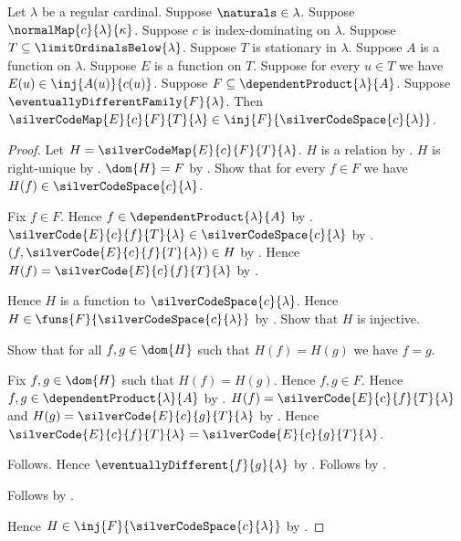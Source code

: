 \begin{theorem}\label{silver_code_map_is_injection}
    Let $\lambda$ be a regular cardinal.
    Suppose $\naturals\in\lambda$.
    Suppose $\normalMap{c}{\lambda}{\kappa}$.
    Suppose $c$ is index-dominating on $\lambda$.
    Suppose $T\subseteq\limitOrdinalsBelow{\lambda}$.
    Suppose $T$ is stationary in $\lambda$.
    Suppose $A$ is a function on $\lambda$.
    Suppose $E$ is a function on $T$.
    Suppose for every $u\in T$ we have
        $E(u)\in\inj{A(u)}{c(u)}$.
    Suppose $F\subseteq\dependentProduct{\lambda}{A}$.
    Suppose $\eventuallyDifferentFamily{F}{\lambda}$.
    Then $\silverCodeMap{E}{c}{F}{T}{\lambda}
        \in\inj{F}{\silverCodeSpace{c}{\lambda}}$.
\end{theorem}
\begin{proof}
    Let $H=\silverCodeMap{E}{c}{F}{T}{\lambda}$.
    $H$ is a relation by .
    $H$ is right-unique
        by .
    $\dom{H}=F$
        by .
    Show that for every $f\in F$ we have
        $H(f)\in\silverCodeSpace{c}{\lambda}$.
    \begin{subproof}
        Fix $f\in F$.
        Hence $f\in\dependentProduct{\lambda}{A}$ by .
        $\silverCode{E}{c}{f}{T}{\lambda}
            \in\silverCodeSpace{c}{\lambda}$
            by .
        $(f,\silverCode{E}{c}{f}{T}{\lambda})\in H$
            by .
        Hence $H(f)=\silverCode{E}{c}{f}{T}{\lambda}$
            by .
    \end{subproof}
    Hence $H$ is a function to $\silverCodeSpace{c}{\lambda}$.
    Hence $H\in\funs{F}{\silverCodeSpace{c}{\lambda}}$
        by .
    Show that $H$ is injective.
    \begin{subproof}
        Show that for all $f,g\in\dom{H}$ such that $H(f)=H(g)$ we have $f=g$.
        \begin{subproof}
            Fix $f,g\in\dom{H}$ such that $H(f)=H(g)$.
            Hence $f,g\in F$.
            Hence $f,g\in\dependentProduct{\lambda}{A}$
                by .
            $H(f)=\silverCode{E}{c}{f}{T}{\lambda}$ and
                $H(g)=\silverCode{E}{c}{g}{T}{\lambda}$
                by .
            Hence $\silverCode{E}{c}{f}{T}{\lambda}
                =\silverCode{E}{c}{g}{T}{\lambda}$.
            \begin{byCase}
                    Follows.
                    Hence $\eventuallyDifferent{f}{g}{\lambda}$
                        by .
                    Follows by
                        .
            \end{byCase}
        \end{subproof}
        Follows by .
    \end{subproof}
    Hence $H\in\inj{F}{\silverCodeSpace{c}{\lambda}}$
        by .
\end{proof}

